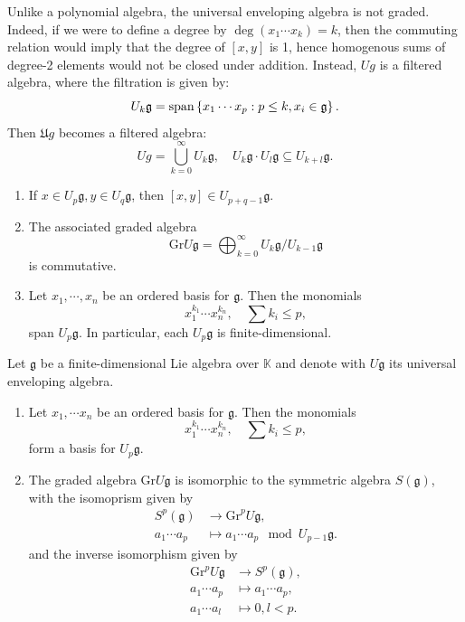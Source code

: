 \documentclass{report}
\begin{document}
Unlike a polynomial algebra, the universal enveloping algebra is not graded.
Indeed, if we were to define a degree by $\deg(x_1 \cdots x_k) = k$, then the commuting relation would imply that the degree of $[x,y]$ is 1, hence homogenous sums of degree-2 elements would not be closed under addition.
Instead, $ U g$ is a filtered algebra, where the filtration is given by:
\[
U_k \mathfrak g = \operatorname{span}\left\{ x_1 \cdots x_p: p \leq k, x_i \in \mathfrak g \right\}.
\]
Then $\mathfrak U g $ becomes a filtered algebra:
\[
U g = \bigcup_{k=0}^\infty U_k \mathfrak g, \quad U_k \mathfrak g \cdot U_l \mathfrak g \subseteq U_{k+l} \mathfrak g.
\]
\begin{proposition}
    \begin{enumerate}[label = (\roman*)]
        \item If $x \in U_p \mathfrak g, y \in U_q \mathfrak g$, then $[x,y] \in U_{p+q-1} \mathfrak g$.
        \item The associated graded algebra
        \[
        \mathrm{Gr}U \mathfrak g = \bigoplus_{k=0}^\infty U_k \mathfrak g / U_{k-1} \mathfrak g
        \]
        is commutative.
        \item Let $x_1, \cdots, x_n$ be an ordered basis for $\mathfrak g$.
        Then the monomials
        \[
        x_1^{k_1} \cdots x_n^{k_n}, \quad \sum k_i \leq p,
        \]
        span $U_p \mathfrak g$. 
        In particular, each $U_p \mathfrak g$ is finite-dimensional.
    \end{enumerate}
\end{proposition}

\begin{theorem}
    Let $\mathfrak g$ be a finite-dimensional Lie algebra over $\mathbb K$ and denote with $U \mathfrak g$ its universal enveloping algebra.
    \begin{enumerate}[label = (\roman*)]
        \item Let $x_1, \cdots x_n$ be an ordered basis for $\mathfrak g$.
        Then the monomials
        \[
        x_1^{k_1} \cdots x_n^{k_n}, \quad \sum k_i \leq p,
        \]
        form a basis for $U_p \mathfrak g$.
        \item The graded algebra $\mathrm{Gr}U \mathfrak g$ is isomorphic to the symmetric algebra $S(\mathfrak g)$, with the isomoprism given by
        \begin{align*}
            S^p(\mathfrak g) &\to \mathrm{Gr}^p U \mathfrak g,\\
            a_1 \cdots a_p &\mapsto a_1 \cdots a_p \mod U_{p-1} \mathfrak g.
        \end{align*}
        and the inverse isomorphism given by
        \begin{align*}
            \mathrm{Gr}^p U \mathfrak g &\to S^p(\mathfrak g),\\
            a_1 \cdots a_p  &\mapsto a_1 \cdots a_p,\\
            a_1 \cdots a_l &\mapsto 0, l < p.
        \end{align*}
    \end{enumerate} 
\end{theorem}
\end{document}
